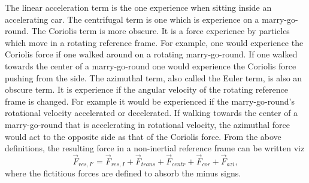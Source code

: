 The linear acceleration term is the one experience when sitting inside an accelerating car. The centrifugal term is one which is experience on a marry-go-round. The Coriolis term is more obscure. It is a force experience by particles which move in a rotating reference frame. For example, one would experience the Coriolis force if one walked around on a rotating marry-go-round. If one walked towards the center of a marry-go-round one would experience the Coriolis force pushing from the side. The azimuthal term, also called the Euler term, is also an obscure term. It is experience if the angular velocity of the rotating reference frame is changed. For example it would be experienced if the marry-go-round's rotational velocity accelerated or decelerated. If walking towards the center of a marry-go-round that is accelerating in rotational velocity, the azimuthal force would act to the opposite side as that of the Coriolis force. From the above definitions, the resulting force in a non-inertial reference frame can be written viz
\begin{equation}
	\vec{F}_{res,I'}=\vec{F}_{res,I}+\vec{F}_{trans}+\vec{F}_{centr}+\vec{F}_{cor}+\vec{F}_{azi},
\end{equation} 
where the fictitious forces are defined to absorb the minus signs.

